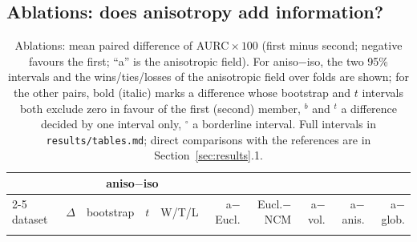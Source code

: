 \documentclass[10pt,a4paper]{article}
\theoremstyle{plain}
\theoremstyle{definition}
\theoremstyle{remark}
\begin{document}
\subsection{Ablations: does anisotropy add information?}

\begin{table}[t]
\centering\footnotesize
\setlength{\tabcolsep}{2.4pt}
\begin{tabular}{lrccrrrrrr}
\toprule
& \multicolumn{4}{c}{aniso$-$iso} & & & & & \\
\cmidrule(lr){2-5}
dataset & $\Delta$ & bootstrap & $t$ & W/T/L & a$-$Eucl. & Eucl.$-$NCM & a$-$vol. & a$-$anis. & a$-$glob.\\
\midrule
\\
\bottomrule
\end{tabular}
\caption{Ablations: mean paired difference of AURC${}\times100$ (first minus second; negative favours the first; ``a'' is the anisotropic field). For aniso$-$iso, the two 95\% intervals and the wins/ties/losses of the anisotropic field over folds are shown; for the other pairs, bold (italic) marks a difference whose bootstrap and $t$ intervals both exclude zero in favour of the first (second) member, $^{b}$ and $^{t}$ a difference decided by one interval only, $^{\circ}$ a borderline interval. Full intervals in \texttt{results/tables.md}; direct comparisons with the references are in Section~\ref{sec:results}.1.}
\label{tab:ablation}
\end{table}
\end{document}
